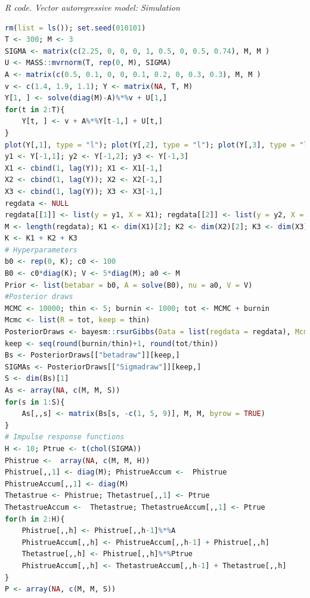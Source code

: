 \begin{enumerate}[leftmargin=*]
\begin{tcolorbox}[enhanced,width=4.67in,center upper,
	fontupper=\large\bfseries,drop shadow southwest,sharp corners]
	\textit{R code. Vector autoregressive model: Simulation}
	\begin{VF}
		\begin{lstlisting}[language=R]
rm(list = ls()); set.seed(010101)
T <- 300; M <- 3
SIGMA <- matrix(c(2.25, 0, 0, 0, 1, 0.5, 0, 0.5, 0.74), M, M )
U <- MASS::mvrnorm(T, rep(0, M), SIGMA)
A <- matrix(c(0.5, 0.1, 0, 0, 0.1, 0.2, 0, 0.3, 0.3), M, M ) 
v <- c(1.4, 1.9, 1.1); Y <- matrix(NA, T, M)
Y[1, ] <- solve(diag(M)-A)%*%v + U[1,]
for(t in 2:T){
	Y[t, ] <- v + A%*%Y[t-1,] + U[t,]
}
plot(Y[,1], type = "l"); plot(Y[,2], type = "l"); plot(Y[,3], type = "l")
y1 <- Y[-1,1]; y2 <- Y[-1,2]; y3 <- Y[-1,3]
X1 <- cbind(1, lag(Y)); X1 <- X1[-1,]
X2 <- cbind(1, lag(Y)); X2 <- X2[-1,]
X3 <- cbind(1, lag(Y)); X3 <- X3[-1,]
regdata <- NULL
regdata[[1]] <- list(y = y1, X = X1); regdata[[2]] <- list(y = y2, X = X2); regdata[[3]] <- list(y = y3, X = X3)
M <- length(regdata); K1 <- dim(X1)[2]; K2 <- dim(X2)[2]; K3 <- dim(X3)[2] 
K <- K1 + K2 + K3
# Hyperparameters
b0 <- rep(0, K); c0 <- 100
B0 <- c0*diag(K); V <- 5*diag(M); a0 <- M
Prior <- list(betabar = b0, A = solve(B0), nu = a0, V = V)
#Posterior draws
MCMC <- 10000; thin <- 5; burnin <- 1000; tot <- MCMC + burnin
Mcmc <- list(R = tot, keep = thin)
PosteriorDraws <- bayesm::rsurGibbs(Data = list(regdata = regdata), Mcmc = Mcmc, Prior = Prior)
keep <- seq(round(burnin/thin)+1, round(tot/thin))
Bs <- PosteriorDraws[["betadraw"]][keep,]
SIGMAs <- PosteriorDraws[["Sigmadraw"]][keep,] 
S <- dim(Bs)[1]
As <- array(NA, c(M, M, S))
for(s in 1:S){
	As[,,s] <- matrix(Bs[s, -c(1, 5, 9)], M, M, byrow = TRUE)
}
# Impulse response functions
H <- 10; Ptrue <- t(chol(SIGMA))
Phistrue <-  array(NA, c(M, M, H))
Phistrue[,,1] <- diag(M); PhistrueAccum <-  Phistrue
PhistrueAccum[,,1] <- diag(M)
Thetastrue <- Phistrue; Thetastrue[,,1] <- Ptrue
ThetastrueAccum <-  Thetastrue; ThetastrueAccum[,,1] <- Ptrue
for(h in 2:H){
	Phistrue[,,h] <- Phistrue[,,h-1]%*%A
	PhistrueAccum[,,h] <- PhistrueAccum[,,h-1] + Phistrue[,,h]
	Thetastrue[,,h] <- Phistrue[,,h]%*%Ptrue
	PhistrueAccum[,,h] <- ThetastrueAccum[,,h-1] + Thetastrue[,,h]
}
P <- array(NA, c(M, M, S))
\end{lstlisting}
	\end{VF}
\end{tcolorbox} 


\end{enumerate}
